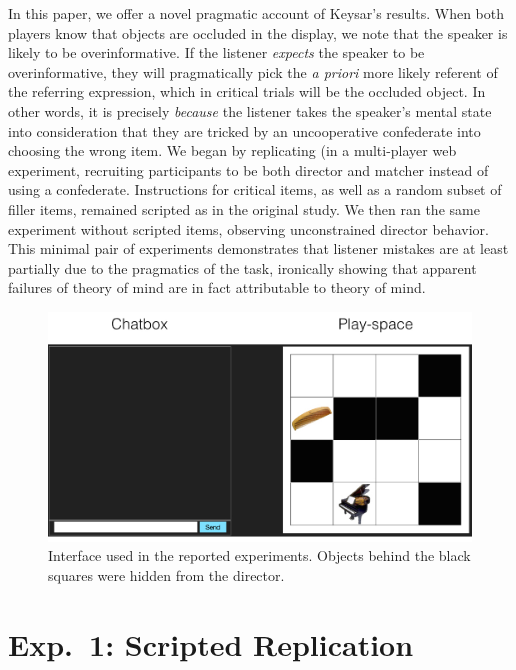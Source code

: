 \documentclass[10pt,letterpaper]{article}
\begin{document}
In this paper, we offer a novel pragmatic account of Keysar's results. When both players know that objects are occluded in the display, we note that the speaker is likely to be overinformative. If the listener \emph{expects} the speaker to be overinformative, they will pragmatically pick the \emph{a priori} more likely referent of the referring expression, which in critical trials will be the occluded object. In other words, it is precisely \emph{because} the listener takes the speaker's mental state into consideration that they are tricked by an uncooperative confederate into choosing the wrong item. We began by replicating  (in a multi-player web experiment, recruiting participants to be both director and matcher instead of using a confederate. Instructions for critical items, as well as a random subset of filler items, remained scripted as in the original study. We then ran the same experiment without scripted items, observing unconstrained director behavior. This minimal pair of experiments demonstrates that listener mistakes are at least partially due to the pragmatics of the task, ironically showing that apparent failures of theory of mind are in fact attributable to theory of mind.

\begin{figure}
\begin{center}
\includegraphics[scale = .35]{images/overall_view.jpg}
\end{center}
\vspace{-.25cm}
\caption{Interface used in the reported experiments. Objects behind the black squares were hidden from the director.}
\label{fig:interface}
\end{figure}

\section{Exp.~1: Scripted Replication}
\label{sec:Exp1}
\end{document}
